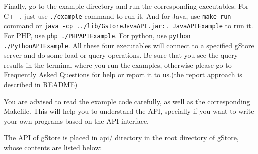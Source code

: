 \documentclass[titlepage, a4paper, 12pt]{article}
\begin{document}
Finally, go to the example directory and run the corresponding
executables. For C++, just use \texttt{./example} command to run it. And
for Java, use \texttt{make\ run} command or \texttt{java\ -cp\ ../lib/GstoreJavaAPI.jar:.\ JavaAPIExample} to run
it. For PHP, use \texttt{php ./PHPAPIExample}. For python, use \texttt{python ./PythonAPIExample}. All these four executables will connect to a specified gStore server
and do some load or query operations. Be sure that you see the query
results in the terminal where you run the examples, otherwise please go
to \hyperref[chapter10]{Frequently Asked Questions} for help or report
it to us.(the report approach is described in
\hyperref[chapter00]{README})

You are advised to read the example code carefully, as well as the
corresponding Makefile. This will help you to understand the API,
specially if you want to write your own programs based on the API
interface.


The API of gStore is placed in api/ directory in the root directory of
gStore, whose contents are listed below:
\end{document}
